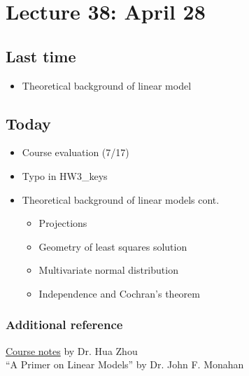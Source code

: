 \setcounter{section}{37}

\section{Lecture 38: April 28}


\subsection*{Last time}
\begin{itemize}
\item Theoretical background of linear model
\end{itemize}


\subsection*{Today}
\begin{itemize}
\item Course evaluation (7/17)
\item Typo in HW3\_keys
\item Theoretical background of linear models cont.
	\begin{itemize}
		\item Projections
		\item Geometry of least squares solution
		\item Multivariate normal distribution
		\item Independence and Cochran's theorem
	\end{itemize}
\end{itemize}

\subsubsection*{Additional reference}
\href{http://hua-zhou.github.io/teaching/st552-2013fall/ST552-2013-Fall-LecNotes.pdf}{Course notes} by Dr. Hua Zhou\\
``A Primer on Linear Models'' by Dr. John F. Monahan


